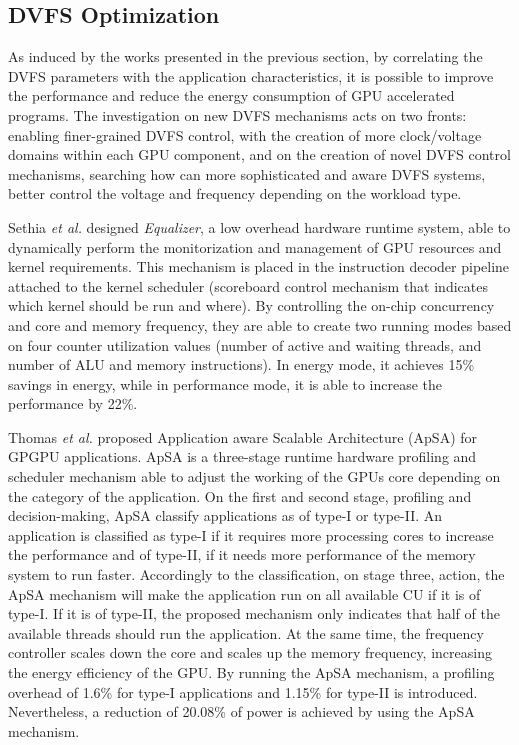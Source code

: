 \subsection{DVFS Optimization}

As induced by the works presented in the previous section, by correlating the DVFS parameters with the application characteristics, it is possible to improve the performance and reduce the energy consumption of GPU accelerated programs.  The investigation on new DVFS mechanisms acts on two fronts: enabling finer-grained DVFS control, with the creation of more clock/voltage domains within each GPU component, and on the creation of novel DVFS control mechanisms, searching how can more sophisticated and aware DVFS systems,  better control the voltage and frequency depending on the workload type.

Sethia \textit{et al.} \cite{sethia_equalizer:_2014} designed \textit{Equalizer}, a low overhead hardware runtime system, able to dynamically perform the monitorization and management of GPU resources and kernel requirements. This mechanism is placed in the instruction decoder pipeline attached to the kernel scheduler (scoreboard control mechanism that indicates which kernel should be run and where). By controlling the on-chip concurrency and core and memory frequency, they are able to create two running modes based on four counter utilization values (number of active and waiting threads, and number of ALU and memory instructions). In energy mode, it achieves 15\% savings in energy, while in performance mode, it is able to increase the performance by 22\%.

Thomas \textit{et al.} \cite{thomas_application_2018} proposed Application aware Scalable Architecture (ApSA) for GPGPU applications. ApSA is a three-stage runtime hardware profiling and scheduler mechanism able to adjust the working of the GPUs core depending on the category of the application. On the first and second stage, profiling and decision-making, ApSA classify applications as of type-I or type-II. An application is classified as type-I if it requires more processing cores to increase the performance and of type-II, if it needs more performance of the memory system to run faster. Accordingly to the classification, on stage three, action, the ApSA mechanism will make the application run on all available CU if it is of type-I. If it is of type-II, the proposed mechanism only indicates that half of the available threads should run the application. At the same time, the frequency controller scales down the core and scales up the memory frequency, increasing the energy efficiency of the GPU. By running the ApSA mechanism, a profiling overhead of 1.6\% for type-I applications and 1.15\% for type-II is introduced. Nevertheless, a reduction of 20.08\% of power is achieved by using the ApSA mechanism.

